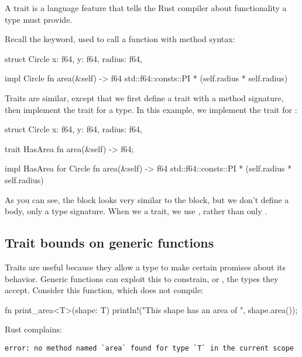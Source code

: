 A trait is a language feature that tells the Rust compiler about functionality a type must provide.

\blank

Recall the  keyword, used to call a function with method syntax:

\begin{rustc}
struct Circle {
    x: f64,
    y: f64,
    radius: f64,
}

impl Circle {
    fn area(&self) -> f64 {
        std::f64::consts::PI * (self.radius * self.radius)
    }
}
\end{rustc}

Traits are similar, except that we first define a trait with a method signature, then implement the trait for a type. In this example, we 
implement the trait  for :

\begin{rustc}
struct Circle {
    x: f64,
    y: f64,
    radius: f64,
}

trait HasArea {
    fn area(&self) -> f64;
}

impl HasArea for Circle {
    fn area(&self) -> f64 {
        std::f64::consts::PI * (self.radius * self.radius)
    }
}
\end{rustc}

As you can see, the  block looks very similar to the  block, but we don't define a body, only a type signature. When 
we  a trait, we use , rather than only .

\subsection*{Trait bounds on generic functions}

Traits are useful because they allow a type to make certain promises about its behavior. Generic functions can exploit this to constrain, 
or , the types they accept. Consider this function, which does not compile:

\begin{rustc}
fn print_area<T>(shape: T) {
    println!("This shape has an area of {}", shape.area());
}
\end{rustc}

Rust complains:

\begin{verbatim}
error: no method named `area` found for type `T` in the current scope
\end{verbatim}

